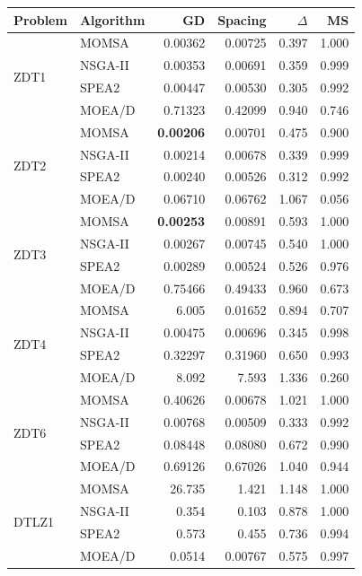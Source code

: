 \documentclass[11pt,a4paper]{article}
\begin{document}
\begin{table}[H]
\centering
\small
\begin{tabular}{llrrrr}
\toprule
Problem & Algorithm & GD & Spacing & $\Delta$ & MS \\
\midrule
\multirow{4}{*}{ZDT1}
 & MOMSA   & 0.00362 & 0.00725 & 0.397 & 1.000 \\
 & NSGA-II & 0.00353 & 0.00691 & 0.359 & 0.999 \\
 & SPEA2   & 0.00447 & 0.00530 & 0.305 & 0.992 \\
 & MOEA/D  & 0.71323 & 0.42099 & 0.940 & 0.746 \\
\midrule
\multirow{4}{*}{ZDT2}
 & MOMSA   & \textbf{0.00206} & 0.00701 & 0.475 & 0.900 \\
 & NSGA-II & 0.00214 & 0.00678 & 0.339 & 0.999 \\
 & SPEA2   & 0.00240 & 0.00526 & 0.312 & 0.992 \\
 & MOEA/D  & 0.06710 & 0.06762 & 1.067 & 0.056 \\
\midrule
\multirow{4}{*}{ZDT3}
 & MOMSA   & \textbf{0.00253} & 0.00891 & 0.593 & 1.000 \\
 & NSGA-II & 0.00267 & 0.00745 & 0.540 & 1.000 \\
 & SPEA2   & 0.00289 & 0.00524 & 0.526 & 0.976 \\
 & MOEA/D  & 0.75466 & 0.49433 & 0.960 & 0.673 \\
\midrule
\multirow{4}{*}{ZDT4}
 & MOMSA   & 6.005   & 0.01652 & 0.894 & 0.707 \\
 & NSGA-II & 0.00475 & 0.00696 & 0.345 & 0.998 \\
 & SPEA2   & 0.32297 & 0.31960 & 0.650 & 0.993 \\
 & MOEA/D  & 8.092   & 7.593   & 1.336 & 0.260 \\
\midrule
\multirow{4}{*}{ZDT6}
 & MOMSA   & 0.40626 & 0.00678 & 1.021 & 1.000 \\
 & NSGA-II & 0.00768 & 0.00509 & 0.333 & 0.992 \\
 & SPEA2   & 0.08448 & 0.08080 & 0.672 & 0.990 \\
 & MOEA/D  & 0.69126 & 0.67026 & 1.040 & 0.944 \\
\midrule
\multirow{4}{*}{DTLZ1}
 & MOMSA   & 26.735  & 1.421   & 1.148 & 1.000 \\
 & NSGA-II & 0.354   & 0.103   & 0.878 & 1.000 \\
 & SPEA2   & 0.573   & 0.455   & 0.736 & 0.994 \\
 & MOEA/D  & 0.0514  & 0.00767 & 0.575 & 0.997 \\

\end{tabular}
\end{table}
\end{document}
